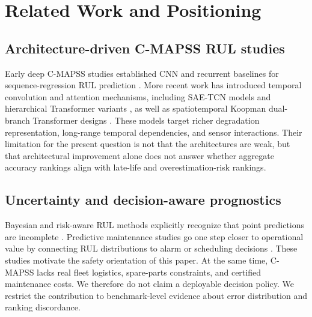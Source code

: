 \documentclass[10pt,twocolumn]{article}
\begin{document}
\section{Related Work and Positioning}

\subsection{Architecture-driven C-MAPSS RUL studies}

Early deep C-MAPSS studies established CNN and recurrent baselines for sequence-regression RUL prediction \citep{Babu2016,Zheng2017,Li2018}. More recent work has introduced temporal convolution and attention mechanisms, including SAE-TCN models and hierarchical Transformer variants \citep{Liu2023SAETCN,Fan2024STAR}, as well as spatiotemporal Koopman dual-branch Transformer designs \citep{Kim2025KoopmanTransformer}. These models target richer degradation representation, long-range temporal dependencies, and sensor interactions. Their limitation for the present question is not that the architectures are weak, but that architectural improvement alone does not answer whether aggregate accuracy rankings align with late-life and overestimation-risk rankings.

\subsection{Uncertainty and decision-aware prognostics}

Bayesian and risk-aware RUL methods explicitly recognize that point predictions are incomplete \citep{Hu2023Bayesian,Xiang2024BayesianGated}. Predictive maintenance studies go one step closer to operational value by connecting RUL distributions to alarm or scheduling decisions \citep{DePater2022,Mitici2023}. These studies motivate the safety orientation of this paper. At the same time, C-MAPSS lacks real fleet logistics, spare-parts constraints, and certified maintenance costs. We therefore do not claim a deployable decision policy. We restrict the contribution to benchmark-level evidence about error distribution and ranking discordance.
\end{document}
